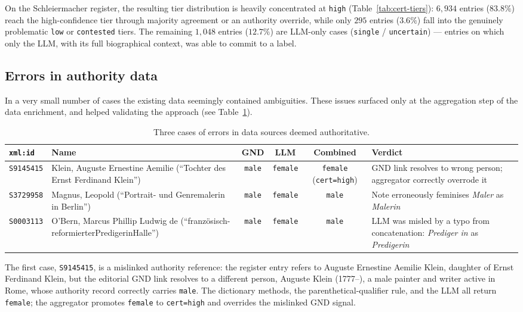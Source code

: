 \documentclass{eceasst}
\begin{document}
On the Schleiermacher register, the resulting tier distribution is heavily concentrated at \texttt{high} (Table~\ref{tab:cert-tiers}): $6{,}934$ entries ($83.8\%$) reach the high-confidence tier through majority agreement or an authority override, while only $295$ entries ($3.6\%$) fall into the genuinely problematic \texttt{low} or \texttt{contested} tiers. The remaining $1{,}048$ entries ($12.7\%$) are LLM-only cases (\texttt{single} / \texttt{uncertain}) --- entries on which only the LLM, with its full biographical context, was able to commit to a label.


\subsection{Errors in authority data}
In a very small number of cases the existing data seemingly contained ambiguities. These issues surfaced only at the aggregation step of the data enrichment, and helped validating the approach (see Table~\ref{tab:contested-examples}).

\begin{table}[h]
  \centering
  \scriptsize
  \setlength{\tabcolsep}{4pt}
  \renewcommand{\arraystretch}{1.2}
  \begin{tabular}{@{}lp{36mm}cccp{38mm}@{}}
    \toprule
    \texttt{xml:id} & Name & GND & LLM & Combined & Verdict \\
    \midrule
    \texttt{S9145415} &
    Klein, Auguste Ernestine Aemilie (``Tochter des Ernst Ferdinand Klein'') &
    \texttt{male} & \texttt{female} & \texttt{female} (\texttt{cert=high}) &
    GND link resolves to wrong person; aggregator correctly overrode it \\
    \addlinespace
    \texttt{S3729958} &
    Magnus, Leopold (``Portrait- und Genremalerin in Berlin'') &
    \texttt{male} & \texttt{female} & \texttt{male} &
    Note erroneously feminises \emph{Maler} as \emph{Malerin} \\
    \addlinespace
    \texttt{S0003113} &
    O'Bern, Marcus Phillip Ludwig de (``französisch-reformierter\-Prediger\-in\-Halle'') &
    \texttt{male} & \texttt{female} & \texttt{male} &
    LLM was misled by a typo from concatenation: \emph{Prediger in} as \emph{Predigerin} \\
    \bottomrule
  \end{tabular}
  \caption{Three cases of errors in data sources deemed authoritative.}
  \label{tab:contested-examples}
\end{table}

The first case, \texttt{S9145415}, is a mislinked authority reference: the register entry refers to Auguste Ernestine Aemilie Klein, daughter of Ernst Ferdinand Klein, but the editorial GND link resolves to a different person, Auguste Klein (1777--), a male painter and writer active in Rome, whose authority record correctly carries \texttt{male}. The dictionary methods, the parenthetical-qualifier rule, and the LLM all return \texttt{female}; the aggregator promotes \texttt{female} to \texttt{cert=high} and overrides the mislinked GND signal.
\end{document}
